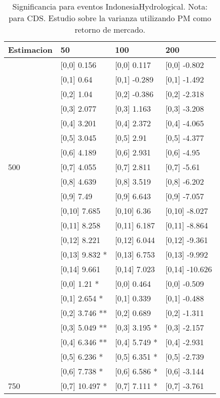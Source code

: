 \begin{table}

\caption{Significancia para eventos IndonesiaHydrological. Nota: para CDS. Estudio sobre la varianza utilizando PM como retorno de mercado.}
\centering
\begin{tabular}[t]{llll}
\toprule
Estimacion & 50 & 100 & 200\\
\midrule
 & {}[0,0] 0.156 & {}[0,0] 0.117 & {}[0,0] -0.802\\
 & {}[0,1] 0.64 & {}[0,1] -0.289 & {}[0,1] -1.492\\
 & {}[0,2] 1.04 & {}[0,2] -0.386 & {}[0,2] -2.318\\
 & {}[0,3] 2.077 & {}[0,3] 1.163 & {}[0,3] -3.208\\
 & {}[0,4] 3.201 & {}[0,4] 2.372 & {}[0,4] -4.065\\
\addlinespace
 & {}[0,5] 3.045 & {}[0,5] 2.91 & {}[0,5] -4.377\\
 & {}[0,6] 4.189 & {}[0,6] 2.931 & {}[0,6] -4.95\\
500 & {}[0,7] 4.055 & {}[0,7] 2.811 & {}[0,7] -5.61\\
 & {}[0,8] 4.639 & {}[0,8] 3.519 & {}[0,8] -6.202\\
 & {}[0,9] 7.49 & {}[0,9] 6.643 & {}[0,9] -7.057\\
\addlinespace
 & {}[0,10] 7.685 & {}[0,10] 6.36 & {}[0,10] -8.027\\
 & {}[0,11] 8.258 & {}[0,11] 6.187 & {}[0,11] -8.864\\
 & {}[0,12] 8.221 & {}[0,12] 6.044 & {}[0,12] -9.361\\
 & {}[0,13] 9.832 * & {}[0,13] 6.753 & {}[0,13] -9.992\\
 & {}[0,14] 9.661 & {}[0,14] 7.023 & {}[0,14] -10.626\\
\addlinespace
 & {}[0,0] 1.21 * & {}[0,0] 0.464 & {}[0,0] -0.509\\
 & {}[0,1] 2.654 * & {}[0,1] 0.339 & {}[0,1] -0.488\\
 & {}[0,2] 3.746 ** & {}[0,2] 0.689 & {}[0,2] -1.311\\
 & {}[0,3] 5.049 ** & {}[0,3] 3.195 * & {}[0,3] -2.157\\
 & {}[0,4] 6.346 ** & {}[0,4] 5.749 * & {}[0,4] -2.931\\
\addlinespace
 & {}[0,5] 6.236 * & {}[0,5] 6.351 * & {}[0,5] -2.739\\
 & {}[0,6] 7.738 * & {}[0,6] 6.586 * & {}[0,6] -3.144\\
750 & {}[0,7] 10.497 * & {}[0,7] 7.111 * & {}[0,7] -3.761\\

\end{tabular}
\end{table}
